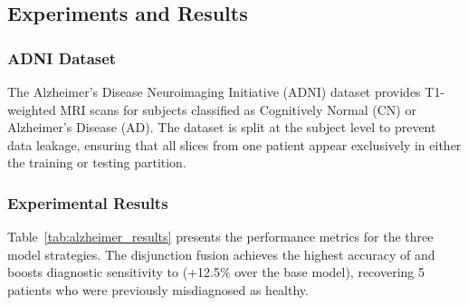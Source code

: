 \subsection{Experiments and Results}

\subsubsection{ADNI Dataset}
The Alzheimer's Disease Neuroimaging Initiative (ADNI) dataset provides T1-weighted MRI scans for subjects classified as Cognitively Normal (CN) or Alzheimer's Disease (AD). The dataset is split at the subject level to prevent data leakage, ensuring that all slices from one patient appear exclusively in either the training or testing partition.

\subsubsection{Experimental Results}
Table~\ref{tab:alzheimer_results} presents the performance metrics for the three model strategies. The disjunction fusion achieves the highest accuracy of  and boosts diagnostic sensitivity to  (+12.5\% over the base model), recovering 5 patients who were previously misdiagnosed as healthy.

\begin{table}[h]
    \centering
    \caption{Performance results of VGG16 models and fusion strategy.}
    \label{tab:alzheimer_results}
\end{table}

